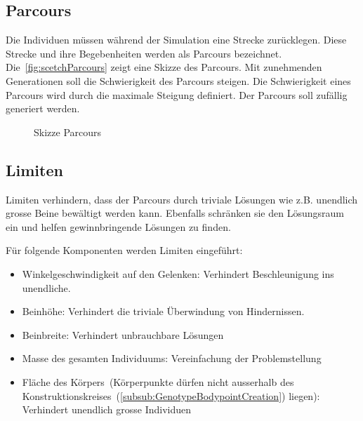     \subsection{Parcours\label{subsub:parcours}}

      Die Individuen müssen während der Simulation eine Strecke zurücklegen.
      Diese Strecke und ihre Begebenheiten werden als Parcours bezeichnet.
      Die~\vref{fig:scetchParcours} zeigt eine Skizze des Parcours.
      Mit zunehmenden Generationen soll die Schwierigkeit des Parcours steigen.
      Die Schwierigkeit eines Parcours wird durch die maximale Steigung definiert.
      Der Parcours soll zufällig generiert werden.

      \begin{figure}[H]
        
        \caption{Skizze Parcours\label{fig:scetchParcours}}
      \end{figure}

    \subsection{Limiten\label{sub:IntroReqLimit}}

      Limiten verhindern, dass der Parcours durch triviale Lösungen wie z.B. unendlich grosse Beine bewältigt werden kann.
      Ebenfalls schränken sie den Lösungsraum ein und helfen gewinnbringende Lösungen zu finden.

      \medskip

      Für folgende Komponenten werden Limiten eingeführt:

      \begin{itemize}
        \item Winkelgeschwindigkeit auf den Gelenken: Verhindert Beschleunigung ins unendliche.
        \item Beinhöhe: Verhindert die triviale Überwindung von Hindernissen.
        \item Beinbreite: Verhindert unbrauchbare Lösungen
        \item Masse des gesamten Individuums: Vereinfachung der Problemstellung
        \item Fläche des Körpers~(Körperpunkte dürfen nicht ausserhalb des Konstruktionskreises~(\vref{subsub:GenotypeBodypointCreation}) liegen): Verhindert unendlich grosse Individuen
      \end{itemize}
